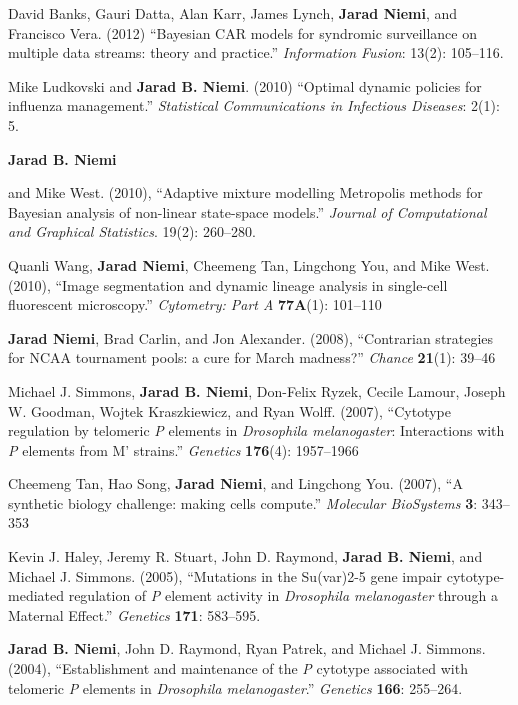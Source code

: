 \documentclass[overlapped,line]{res}
\begin{document}
\begin{resume}
David Banks, Gauri Datta, Alan Karr, James Lynch, {\bf Jarad Niemi}, and Francisco Vera. (2012) ``Bayesian CAR models for syndromic surveillance on multiple data streams: theory and practice.'' \emph{Information Fusion}: 13(2): 105--116.

Mike Ludkovski and {\bf Jarad B. Niemi}. (2010) ``Optimal dynamic policies for influenza management.'' \emph{Statistical Communications in Infectious Diseases}: 2(1): 5.

\newpage \opening

{\bf Jarad B. Niemi} and Mike West. (2010), ``Adaptive mixture modelling Metropolis methods for Bayesian analysis of non-linear state-space models.'' \emph{Journal of Computational and Graphical Statistics}. 19(2): 260--280.

Quanli Wang, {\bf Jarad Niemi}, Cheemeng Tan, Lingchong You, and Mike West. (2010), ``Image segmentation and dynamic lineage analysis in single-cell fluorescent microscopy.'' \emph{Cytometry: Part A} {\bf 77A}(1): 101--110

{\bf Jarad Niemi}, Brad Carlin, and Jon Alexander. (2008), ``Contrarian strategies for NCAA tournament pools: a cure for March madness?'' \emph{Chance} {\bf 21}(1): 39--46


Michael J. Simmons, {\bf Jarad B. Niemi}, Don-Felix Ryzek, Cecile Lamour, Joseph W. Goodman, Wojtek Kraszkiewicz, and Ryan Wolff. (2007), ``Cytotype regulation by telomeric \emph{P} elements in \emph{Drosophila melanogaster}: Interactions with \emph{P} elements from M' strains.'' \emph{Genetics} {\bf 176}(4): 1957--1966

Cheemeng Tan, Hao Song, {\bf Jarad Niemi}, and Lingchong You. (2007), ``A synthetic biology challenge: making cells compute.'' \emph{Molecular BioSystems}  {\bf 3}: 343--353

Kevin J. Haley, Jeremy R. Stuart, John D. Raymond, {\bf Jarad B. Niemi}, and Michael J. Simmons. (2005), ``Mutations in the Su(var)2-5 gene impair cytotype-mediated regulation of \emph{P} element activity in \emph{Drosophila melanogaster} through a Maternal Effect.'' \emph{Genetics} {\bf 171}: 583--595.

{\bf Jarad B. Niemi}, John D. Raymond, Ryan Patrek, and Michael J. Simmons. (2004), ``Establishment and maintenance of the \emph{P} cytotype associated with telomeric \emph{P} elements in \emph{Drosophila melanogaster}.'' \emph{Genetics} {\bf 166}: 255--264.


\end{resume}
\end{document}
